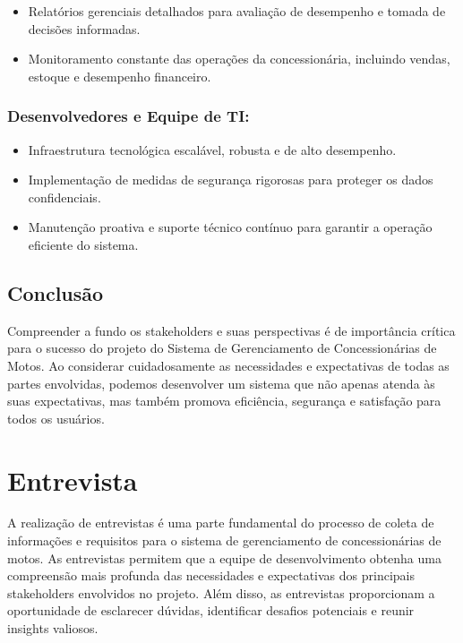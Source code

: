 \begin{itemize}
	\item Relatórios gerenciais detalhados para avaliação de desempenho e tomada de decisões informadas.
	\item Monitoramento constante das operações da concessionária, incluindo vendas, estoque e desempenho financeiro.
\end{itemize}

\subsubsection{Desenvolvedores e Equipe de TI:}

\begin{itemize}
	\item Infraestrutura tecnológica escalável, robusta e de alto desempenho.
	\item Implementação de medidas de segurança rigorosas para proteger os dados confidenciais.
	\item Manutenção proativa e suporte técnico contínuo para garantir a operação eficiente do sistema.
\end{itemize}

\subsection{Conclusão}

Compreender a fundo os stakeholders e suas perspectivas é de importância crítica para o sucesso do projeto do Sistema de Gerenciamento de Concessionárias de Motos. Ao considerar cuidadosamente as necessidades e expectativas de todas as partes envolvidas, podemos desenvolver um sistema que não apenas atenda às suas expectativas, mas também promova eficiência, segurança e satisfação para todos os usuários.


\section{Entrevista}

A realização de entrevistas é uma parte fundamental do processo de coleta de informações e requisitos para o sistema de gerenciamento de concessionárias de motos. As entrevistas permitem que a equipe de desenvolvimento obtenha uma compreensão mais profunda das necessidades e expectativas dos principais stakeholders envolvidos no projeto. Além disso, as entrevistas proporcionam a oportunidade de esclarecer dúvidas, identificar desafios potenciais e reunir insights valiosos.

